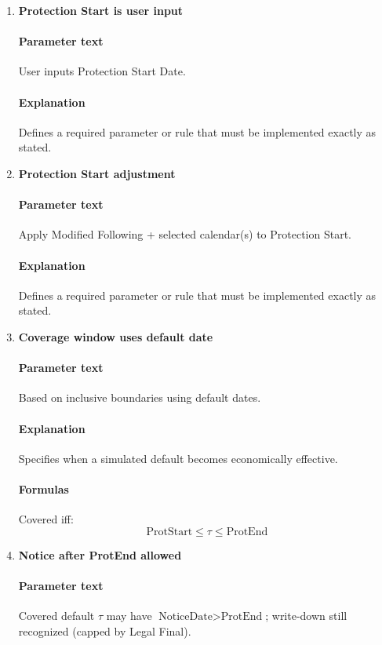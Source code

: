 \documentclass[11pt]{article}
\begin{document}
\begin{enumerate}[label=\arabic*),leftmargin=*,align=left]
\paragraph{Explanation} Specifies when a simulated default becomes economically effective.

\item \textbf{Protection Start is user input}
\paragraph{Parameter text} User inputs Protection Start Date.
\paragraph{Explanation} Defines a required parameter or rule that must be implemented exactly as stated.

\item \textbf{Protection Start adjustment}
\paragraph{Parameter text} Apply Modified Following + selected calendar(s) to Protection Start.
\paragraph{Explanation} Defines a required parameter or rule that must be implemented exactly as stated.

\item \textbf{Coverage window uses default date}
\paragraph{Parameter text} Based on inclusive boundaries using default dates.
\paragraph{Explanation} Specifies when a simulated default becomes economically effective.
\paragraph{Formulas} Covered iff:
\[ \text{ProtStart} \le \tau \le \text{ProtEnd} \]

\item \textbf{Notice after ProtEnd allowed}
\paragraph{Parameter text} Covered default $\tau$ may have $\text{NoticeDate} > \text{ProtEnd}$; write-down still recognized (capped by Legal Final).

\end{enumerate}
\end{document}

